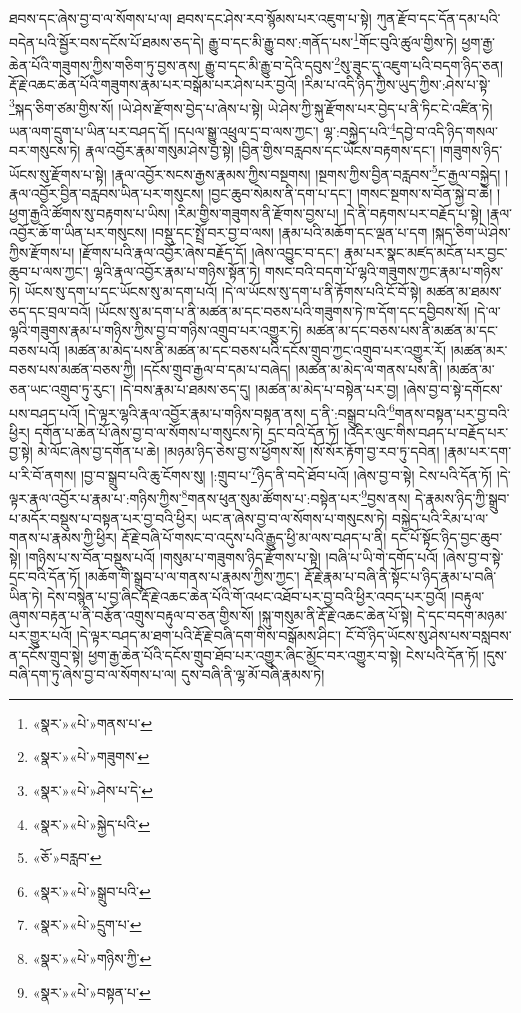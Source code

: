 ཐབས་དང་ཞེས་བྱ་བ་ལ་སོགས་པ་ལ། ཐབས་དང་ཤེས་རབ་སྙོམས་པར་འཇུག་པ་སྟེ། ཀུན་རྫོབ་དང་དོན་དམ་པའི་བདེན་པའི་སྦྱོར་བས་དངོས་པོ་ཐམས་ཅད་དེ། རྒྱུ་བ་དང་མི་རྒྱུ་བས་:གནོད་པས་\footnote{«སྣར་»«པེ་»གནས་པ་}གོང་བུའི་ཚུལ་གྱིས་ཏེ། ཕྱག་རྒྱ་ཆེན་པོའི་གཟུགས་ཀྱིས་གཅིག་ཏུ་བྱས་ནས། རྒྱུ་བ་དང་མི་རྒྱུ་བ་དེའི་དབུས་\footnote{«སྣར་»«པེ་»གཟུགས་}སུ་ཟུང་དུ་འཇུག་པའི་བདག་ཉིད་ཅན། རྡོ་རྗེ་འཆང་ཆེན་པོའི་གཟུགས་རྣམ་པར་བསྒོམ་པར་ཤེས་པར་བྱའོ། །རིམ་པ་འདི་ཉིད་ཀྱིས་ཡུད་ཀྱིས་:ཤེས་པ་སྟེ་\footnote{«སྣར་»«པེ་»ཤེས་པ་དེ་}སྐད་ཅིག་ཙམ་གྱིས་སོ། །ཡེ་ཤེས་རྫོགས་བྱེད་པ་ཞེས་པ་སྟེ། ཡེ་ཤེས་ཀྱི་སྐུ་རྫོགས་པར་བྱེད་པ་ནི་ཏིང་ངེ་འཛིན་ཏེ། ཡན་ལག་དྲུག་པ་ཡིན་པར་བཤད་དོ། །དཔལ་སྒྱུ་འཕྲུལ་དྲ་བ་ལས་ཀྱང་། ལྷ་:བསྐྱེད་པའི་\footnote{«སྣར་»«པེ་»སྐྱེད་པའི་}དབྱེ་བ་འདི་ཉིད་གསལ་བར་གསུངས་ཏེ། རྣལ་འབྱོར་རྣམ་གསུམ་ཤེས་བྱ་སྟེ། །བྱིན་གྱིས་བརླབས་དང་ཡོངས་བརྟགས་དང་། །གཟུགས་ཉིད་ཡོངས་སུ་རྫོགས་པ་སྟེ། །རྣལ་འབྱོར་སངས་རྒྱས་རྣམས་ཀྱིས་བསྔགས། །སྔགས་ཀྱིས་བྱིན་བརླབས་\footnote{«ཅོ་»བརླབ་}ང་རྒྱལ་བསྐྱེད། །རྣལ་འབྱོར་བྱིན་བརླབས་ཡིན་པར་གསུངས། །བྱང་ཆུབ་སེམས་ནི་དག་པ་དང་། །གསང་སྔགས་ས་བོན་སྐྱེ་བ་ཆེ། །ཕྱག་རྒྱའི་ཚོགས་སུ་བརྟགས་པ་ཡིས། །རིམ་གྱིས་གཟུགས་ནི་རྫོགས་བྱས་པ། །དེ་ནི་བརྟགས་པར་བརྗོད་པ་སྟེ། །རྣལ་འབྱོར་ཆོ་ག་ཡིན་པར་གསུངས། །བསྡུ་དང་སྤྲོ་བར་བྱ་བ་ལས། །རྣམ་པའི་མཆོག་དང་ལྡན་པ་དག །སྐད་ཅིག་ཡེ་ཤེས་ཀྱིས་རྫོགས་པ། །རྫོགས་པའི་རྣལ་འབྱོར་ཞེས་བརྗོད་དོ། །ཞེས་འབྱུང་བ་དང་། རྣམ་པར་སྣང་མཛད་མངོན་པར་བྱང་ཆུབ་པ་ལས་ཀྱང་། ལྷའི་རྣལ་འབྱོར་རྣམ་པ་གཉིས་སྟོན་ཏེ། གསང་བའི་བདག་པོ་ལྷའི་གཟུགས་ཀྱང་རྣམ་པ་གཉིས་ཏེ། ཡོངས་སུ་དག་པ་དང་ཡོངས་སུ་མ་དག་པའོ། །དེ་ལ་ཡོངས་སུ་དག་པ་ནི་རྟོགས་པའི་ངོ་བོ་སྟེ། མཚན་མ་ཐམས་ཅད་དང་བྲལ་བའོ། །ཡོངས་སུ་མ་དག་པ་ནི་མཚན་མ་དང་བཅས་པའི་གཟུགས་ཏེ་ཁ་དོག་དང་དབྱིབས་སོ། །དེ་ལ་ལྷའི་གཟུགས་རྣམ་པ་གཉིས་ཀྱིས་བྱ་བ་གཉིས་འགྲུབ་པར་འགྱུར་ཏེ། མཚན་མ་དང་བཅས་པས་ནི་མཚན་མ་དང་བཅས་པའོ། །མཚན་མ་མེད་པས་ནི་མཚན་མ་དང་བཅས་པའི་དངོས་གྲུབ་ཀྱང་འགྲུབ་པར་འགྱུར་རོ། །མཚན་མར་བཅས་པས་མཚན་བཅས་ཀྱི། །དངོས་གྲུབ་རྒྱལ་བ་དམ་པ་བཞེད། །མཚན་མ་མེད་ལ་གནས་པས་ནི། །མཚན་མ་ཅན་ཡང་འགྲུབ་ཏུ་རུང་། །དེ་བས་རྣམ་པ་ཐམས་ཅད་དུ། །མཚན་མ་མེད་པ་བསྟེན་པར་བྱ། །ཞེས་བྱ་བ་སྟེ་དགོངས་པས་བཤད་པའོ། །དེ་ལྟར་ལྷའི་རྣལ་འབྱོར་རྣམ་པ་གཉིས་བསྟན་ནས། ད་ནི་:བསྒྲུབ་པའི་\footnote{«སྣར་»«པེ་»སྒྲུབ་པའི་}གནས་བསྟན་པར་བྱ་བའི་ཕྱིར། དགོན་པ་ཆེན་པོ་ཞེས་བྱ་བ་ལ་སོགས་པ་གསུངས་ཏེ། དྲང་བའི་དོན་ཏོ། །འདིར་ལུང་གིས་བཤད་པ་བརྗོད་པར་བྱ་སྟེ། མེ་ལོང་ཞེས་བྱ་དགོན་པ་ཆེ། །མཉམ་ཉིད་ཅེས་བྱ་ས་ཕྱོགས་སོ། །སོ་སོར་རྟོག་བྱ་རབ་ཏུ་དབེན། །རྣམ་པར་དག་པ་རི་བོ་ནགས། །བྱ་བ་སྒྲུབ་པའི་ཆུ་ངོགས་སུ། །:གྲུབ་པ་\footnote{«སྣར་»«པེ་»དྲུག་པ་}ཉིད་ནི་བདེ་ཐོབ་པའོ། །ཞེས་བྱ་བ་སྟེ། ངེས་པའི་དོན་ཏོ། །དེ་ལྟར་རྣལ་འབྱོར་པ་རྣམ་པ་:གཉིས་ཀྱིས་\footnote{«སྣར་»«པེ་»གཉིས་ཀྱི་}གནས་ཕུན་སུམ་ཚོགས་པ་:བསྟེན་པར་\footnote{«སྣར་»«པེ་»བསྟན་པ་}བྱས་ནས། དེ་རྣམས་ཉིད་ཀྱི་སྒྲུབ་པ་མདོར་བསྡུས་པ་བསྟན་པར་བྱ་བའི་ཕྱིར། ཡང་ན་ཞེས་བྱ་བ་ལ་སོགས་པ་གསུངས་ཏེ། བསྐྱེད་པའི་རིམ་པ་ལ་གནས་པ་རྣམས་ཀྱི་ཕྱིར། རྡོ་རྗེ་བཞི་པོ་གསང་བ་འདུས་པའི་རྒྱུད་ཕྱི་མ་ལས་བཤད་པ་ནི། དང་པོ་སྟོང་ཉིད་བྱང་ཆུབ་སྟེ། །གཉིས་པ་ས་བོན་བསྡུས་པའོ། །གསུམ་པ་གཟུགས་ཉིད་རྫོགས་པ་སྟེ། །བཞི་པ་ཡི་གེ་དགོད་པའོ། །ཞེས་བྱ་བ་སྟེ་དྲང་བའི་དོན་ཏོ། །མཆོག་གི་སྒྲུབ་པ་ལ་གནས་པ་རྣམས་ཀྱིས་ཀྱང་། རྡོ་རྗེ་རྣམ་པ་བཞི་ནི་སྟོང་པ་ཉིད་རྣམ་པ་བཞི་ཡིན་ཏེ། དེས་བསྙེན་པ་བྱ་ཞིང་རྡོ་རྗེ་འཆང་ཆེན་པོའི་གོ་འཕང་འཐོབ་པར་བྱ་བའི་ཕྱིར་འབད་པར་བྱའོ། །བརྟུལ་ཞུགས་བརྟན་པ་ནི་བརྩོན་འགྲུས་བརྟུལ་བ་ཅན་གྱིས་སོ། །སྐུ་གསུམ་ནི་རྡོ་རྗེ་འཆང་ཆེན་པོ་སྟེ། དེ་དང་བདག་མཉམ་པར་གྱུར་པའོ། །དེ་ལྟར་བཤད་མ་ཐག་པའི་རྡོ་རྗེ་བཞི་དག་གིས་བསྒོམས་ཤིང་། ངོ་བོ་ཉིད་ཡོངས་སུ་ཤེས་པས་བསླབས་ན་དངོས་གྲུབ་སྟེ། ཕྱག་རྒྱ་ཆེན་པོའི་དངོས་གྲུབ་ཐོབ་པར་འགྱུར་ཞིང་མྱོང་བར་འགྱུར་བ་སྟེ། ངེས་པའི་དོན་ཏོ། །དུས་བཞི་དག་ཏུ་ཞེས་བྱ་བ་ལ་སོགས་པ་ལ། དུས་བཞི་ནི་ལྷ་མོ་བཞི་རྣམས་ཏེ། 